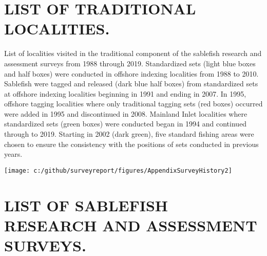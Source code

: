 \documentclass[12pt]{article}\usepackage[]{graphicx}\usepackage[]{color}
\begin{document}
\begin{appendices}

\clearpage

\section{LIST OF TRADITIONAL LOCALITIES.}
\label{app:first-appendix}

List of localities visited in the traditional component of the sablefish research and assessment surveys from 1988 through 2019. Standardized sets (light blue boxes and half boxes) were conducted in offshore indexing localities from 1988 to 2010. Sablefish were tagged and released (dark blue half boxes) from standardized sets at offshore indexing localities beginning in 1991 and ending in 2007. In 1995, offshore tagging localities where only traditional tagging sets (red boxes) occurred were added in 1995 and discontinued in 2008. Mainland Inlet localities where standardized sets (green boxes) were conducted began in 1994 and continued through to 2019. Starting in 2002 (dark green), five standard fishing areas were chosen to ensure the consistency with the positions of sets conducted in previous years.
\begin{center}\texttt{[image: c:/github/surveyreport/figures/AppendixSurveyHistory2]} \end{center}
\clearpage

\section{LIST OF SABLEFISH RESEARCH AND ASSESSMENT SURVEYS.}
\label{app:second-appendix}


\end{appendices}
\end{document}
